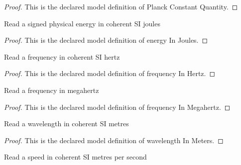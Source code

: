 \begin{proof}
  This is the declared model definition of Planck Constant Quantity.
\end{proof}
\begin{definition}
  \label{def:physics:phyx-mini-0577:phyxminiproblems-problemphyxmini0577-energyinjoules}
  Read a signed physical energy in coherent SI joules
\end{definition}
\begin{proof}
  This is the declared model definition of energy In Joules.
\end{proof}
\begin{definition}
  \label{def:physics:phyx-mini-0577:phyxminiproblems-problemphyxmini0577-frequencyinhertz}
  Read a frequency in coherent SI hertz
\end{definition}
\begin{proof}
  This is the declared model definition of frequency In Hertz.
\end{proof}
\begin{definition}
  \label{def:physics:phyx-mini-0577:phyxminiproblems-problemphyxmini0577-frequencyinmegahertz}
  Read a frequency in megahertz
\end{definition}
\begin{proof}
  This is the declared model definition of frequency In Megahertz.
\end{proof}
\begin{definition}
  \label{def:physics:phyx-mini-0577:phyxminiproblems-problemphyxmini0577-wavelengthinmeters}
  Read a wavelength in coherent SI metres
\end{definition}
\begin{proof}
  This is the declared model definition of wavelength In Meters.
\end{proof}
\begin{definition}
  \label{def:physics:phyx-mini-0577:phyxminiproblems-problemphyxmini0577-speedinmeterspersecond}
  Read a speed in coherent SI metres per second
\end{definition}
